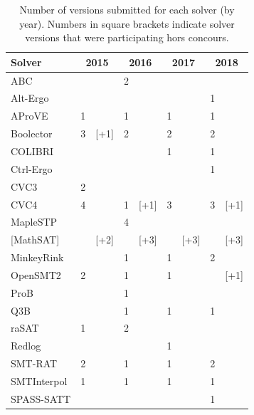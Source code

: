 \documentclass[dvipsnames,table,twoside,11pt]{article}
\begin{document}
\begin{table}
  \caption{Number of versions submitted for each solver (by year).
    Numbers in square brackets indicate solver versions that were
    participating hors concours.}
  \label{table:participants-history}
  \centering
  \begin{tabular}{lr@{\,\,}rr@{\,\,}rr@{\,\,}rr@{\,\,}r}
    \toprule
    Solver & \multicolumn{2}{c}{2015} & \multicolumn{2}{c}{2016} & \multicolumn{2}{c}{2017} & \multicolumn{2}{c}{2018} \\
    \midrule
    ABC               &    &      &  2 &      &    &      &    &      \\
    Alt-Ergo          &    &      &    &      &    &      &  1 &      \\
    AProVE            &  1 &      &  1 &      &  1 &      &  1 &      \\
    Boolector         &  3 & [+1] &  2 &      &  2 &      &  2 &      \\
    COLIBRI           &    &      &    &      &  1 &      &  1 &      \\
    Ctrl-Ergo         &    &      &    &      &    &      &  1 &      \\
    CVC3              &  2 &      &    &      &    &      &    &      \\
    CVC4              &  4 &      &  1 & [+1] &  3 &      &  3 & [+1] \\
    MapleSTP          &    &      &  4 &      &    &      &    &      \\
    {[}MathSAT{]}     &    & [+2] &    & [+3] &    & [+3] &    & [+3] \\
    MinkeyRink        &    &      &  1 &      &  1 &      &  2 &      \\
    OpenSMT2          &  2 &      &  1 &      &  1 &      &    & [+1] \\
    ProB              &    &      &  1 &      &    &      &    &      \\
    Q3B               &    &      &  1 &      &  1 &      &  1 &      \\
    raSAT             &  1 &      &  2 &      &    &      &    &      \\
    Redlog            &    &      &    &      &  1 &      &    &      \\
    SMT-RAT           &  2 &      &  1 &      &  1 &      &  2 &      \\
    SMTInterpol       &  1 &      &  1 &      &  1 &      &  1 &      \\
    SPASS-SATT        &    &      &    &      &    &      &  1 &      \\

\end{tabular}
\end{table}
\end{document}

